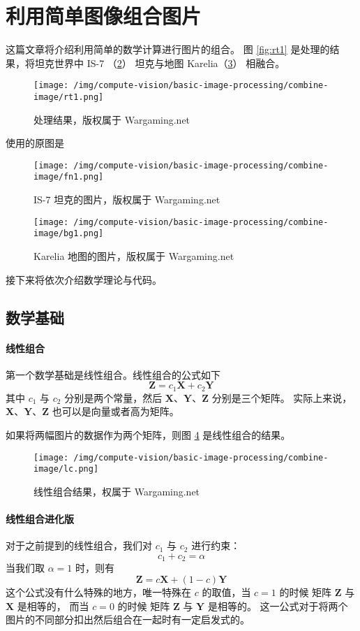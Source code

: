 \section{利用简单图像组合图片}

这篇文章将介绍利用简单的数学计算进行图片的组合。
图 \ref{fig:rt1} 是处理的结果，将坦克世界中 IS-7 （\ref{fg:fn}） 坦克与地图 Karelia（\ref{fg:bg1}） 相融合。
\begin{figure}
    \centering
    \texttt{[image: /img/compute-vision/basic-image-processing/combine-image/rt1.png]}
    \label{fg:rt1}
    \caption{处理结果，版权属于 Wargaming.net}
\end{figure}
使用的原图是
\begin{figure}
    \centering
    \texttt{[image: /img/compute-vision/basic-image-processing/combine-image/fn1.png]}
    \label{fg:fn}
    \caption{IS-7 坦克的图片，版权属于 Wargaming.net}
\end{figure}
\begin{figure}
    \centering
    \texttt{[image: /img/compute-vision/basic-image-processing/combine-image/bg1.png]}
    \label{fg:bg1}
    \caption{Karelia 地图的图片，版权属于 Wargaming.net}
\end{figure}

接下来将依次介绍数学理论与代码。

\subsection{数学基础}

\paragraph{线性组合}
第一个数学基础是线性组合。线性组合的公式如下
\[
    \mathbf{Z} = c_1 \mathbf{X} + c_2 \mathbf{Y}
\]
其中 $c_1$ 与 $c_2$ 分别是两个常量，然后 $\mathbf{X}$、$\mathbf{Y}$、$\mathbf{Z}$ 分别是三个矩阵。
实际上来说，$\mathbf{X}$、$\mathbf{Y}$、$\mathbf{Z}$ 也可以是向量或者高为矩阵。

如果将两幅图片的数据作为两个矩阵，则图 \ref{fg:lc} 是线性组合的结果。

\begin{figure}
    \centering
    \texttt{[image: /img/compute-vision/basic-image-processing/combine-image/lc.png]}
    \label{fg:lc}
    \caption{线性组合结果，权属于 Wargaming.net}
\end{figure}

\paragraph{线性组合进化版}
对于之前提到的线性组合，我们对  $c_1$ 与 $c_2$ 进行约束：
\[
    c_1 + c_2 = \alpha
\]
当我们取 $\alpha = 1$ 时，则有
\[
    \mathbf{Z} = c \mathbf{X} + (1 - c) \mathbf{Y}
\]
这个公式没有什么特殊的地方，唯一特殊在 $c$ 的取值，当 $c=1$ 的时候 矩阵 $\mathbf{Z}$ 与 $\mathbf{X}$ 是相等的，
而当 $c=0$ 的时候 矩阵 $\mathbf{Z}$ 与 $\mathbf{Y}$ 是相等的。
这一公式对于将两个图片的不同部分扣出然后组合在一起时有一定启发式的。

